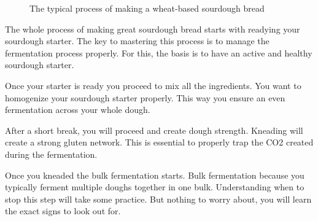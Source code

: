 \begin{figure}[!htb]
  \caption{The typical process of making a wheat-based sourdough bread}
  \label{fig:wheat-sourdough-process}
\end{figure}

The whole process of making great sourdough bread starts with
readying your sourdough starter. The key to mastering
this process is to manage the fermentation process properly.
For this, the basis is to have an active and healthy
sourdough starter.

Once your starter is ready you proceed to mix all the ingredients.
You want to homogenize your sourdough starter properly. This
way you ensure an even fermentation across your whole dough.

After a short break, you will proceed and create dough strength.
Kneading will create a strong gluten network. This is essential
to properly trap the CO2 created during the fermentation.

Once you kneaded the bulk fermentation starts. Bulk fermentation
because you typically ferment multiple doughs together in one bulk.
Understanding when to stop this step will take some practice.
But nothing to worry about, you will learn the exact signs to look out for.

